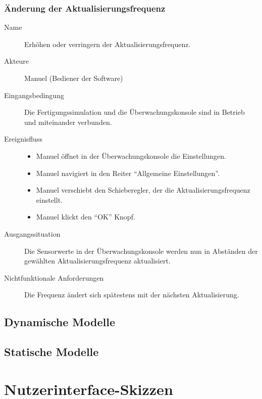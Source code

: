 \documentclass[parskip=full]{scrartcl}
\begin{document}
\subsubsection{Änderung der Aktualisierungsfrequenz}
\begin{description}
 \item[Name] Erhöhen oder verringern der Aktualisierungsfrequenz.
 \item[Akteure] Manuel (Bediener der Software)
 \item[Eingangsbedingung] Die Fertigungssimulation und die Überwachungskonsole sind in Betrieb und miteinander verbunden.
 \item[Ereignisfluss]
 \begin{itemize}[noitemsep]
  \item Manuel öffnet in der Überwachungskonsole die Einstellungen.
  \item Manuel navigiert in den Reiter ``Allgemeine Einstellungen''.
  \item Manuel verschiebt den Schieberegler, der die Aktualisierungsfrequenz einstellt.
  \item Manuel klickt den ``OK'' Knopf.
 \end{itemize}
 \item[Ausgangssituation] Die Sensorwerte in der Überwachungskonsole werden nun in Abständen der gewählten Aktualisierungsfrequenz aktualisiert.
 \item [Nichtfunktionale Anforderungen] Die Frequenz ändert sich spätestens mit der nächsten Aktualisierung.
\end{description}

\subsection{Dynamische Modelle}
\Blindtext[1]

\subsection{Statische Modelle}
\Blindtext[1]

\section{Nutzerinterface-Skizzen}
\end{document}
